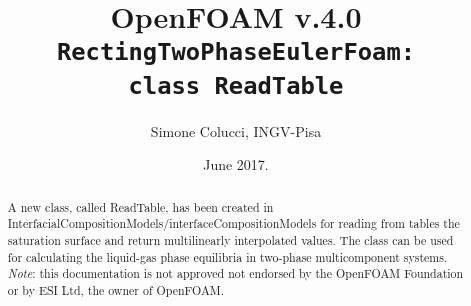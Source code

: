 \documentclass[a4paper, 12 pt, fleqn]{article}
\title{OpenFOAM\textsuperscript{\textregistered} v.4.0 \\ {\tt RectingTwoPhaseEulerFoam:} \\ {\tt class ReadTable}}
\author{Simone Colucci, INGV-Pisa}
\date{June 2017.}
\begin{document}
\maketitle 
\begin{abstract}
 A new class, called ReadTable, has been created in InterfacialCompositionModels/interfaceCompositionModels for reading from tables the saturation surface and return multilinearly interpolated values. The class can be used for calculating the liquid-gas phase equilibria in two-phase multicomponent systems. \\

 {\em Note}: this documentation is not approved not endorsed by the OpenFOAM Foundation or by ESI Ltd, the owner of OpenFOAM\textsuperscript{\textregistered}.
\end{abstract}
\end{document}
